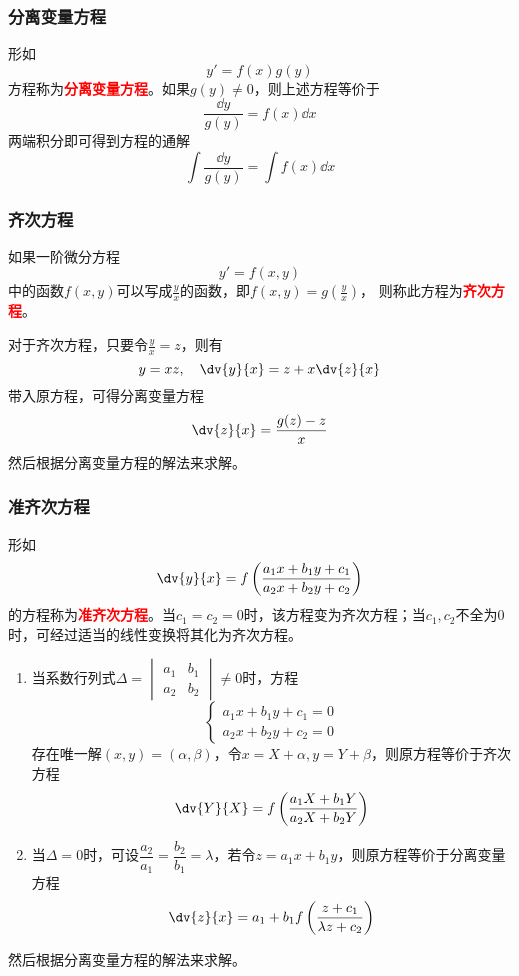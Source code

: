 \subsubsection{分离变量方程}
形如\[ y'=f(x)g(y) \]方程称为\textcolor{red}{\textbf{\textsf{分离变量方程}}}。如果$g(y)\neq 0$，则上述方程等价于
\[ \frac{\dd{y}}{g(y)} = f(x)\dd{x} \]
两端积分即可得到方程的通解
\[ \int \frac{\dd{y}}{g(y)} = \int f(x)\dd{x} \]

\subsubsection{齐次方程}
如果一阶微分方程\[ y' = f(x,y) \]中的函数$f(x,y)$可以写成$\frac{y}{x}$的函数，即$f(x,y)=g(\frac{y}{x})$，
则称此方程为\textcolor{red}{\textbf{\textsf{齐次方程}}}。

对于齐次方程，只要令$\frac{y}{x}=z$，则有
\[ y=xz,\quad \dv{y}{x} = z + x\dv{z}{x} \]
带入原方程，可得分离变量方程
\[ \dv{z}{x} = \frac{g(z)-z}{x} \]
然后根据分离变量方程的解法来求解。

\subsubsection{准齐次方程}
形如
\[ \dv{y}{x} = f\left(\frac{a_1 x+ b_1 y + c_1}{a_2 x + b_2 y + c_2}\right) \]
的方程称为\textcolor{red}{\textbf{\textsf{准齐次方程}}}。当$c_1=c_2=0$时，该方程变为齐次方程；当$c_1,c_2$不全为$0$时，可经过适当的线性变换将其化为齐次方程。

\begin{enumerate}[(1)]
    \item 当系数行列式$\Delta = \begin{vmatrix}a_1 &　b_1 \\ a_2 & b_2\end{vmatrix}\neq 0$时，方程
          \[ \begin{cases}
                  a_1x + b_1y + c_1 = 0 \\
                  a_2x + b_2y + c_2 = 0
              \end{cases} \]存在唯一解$(x,y)=(\alpha,\beta)$，令$x=X+\alpha,y=Y+\beta$，则原方程等价于齐次方程
          \[ \dv{Y}{X} = f\left(\frac{a_1X +b_1Y}{a_2X + b_2Y}\right) \]
    \item 当$\Delta = 0$时，可设$\dfrac{a_2}{a_1}=\dfrac{b_2}{b_1}=\lambda$，若令$z=a_1x+b_1y$，则原方程等价于分离变量方程
          \[ \dv{z}{x} = a_1 + b_1 f\left(\frac{z+c_1}{\lambda z + c_2}\right) \]
\end{enumerate}
然后根据分离变量方程的解法来求解。


